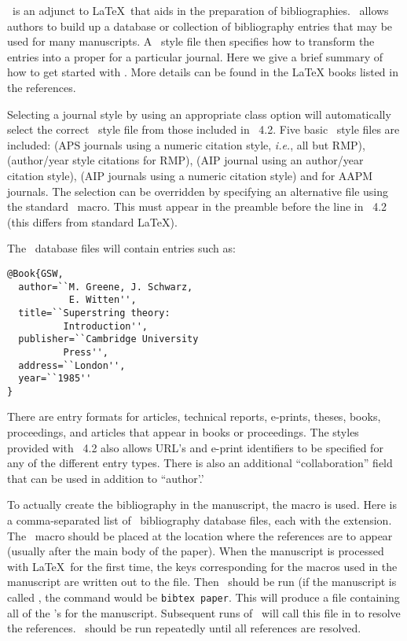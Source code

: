 \documentclass[%
,aps%
 ,twocolumn%
 ,secnumarabic%
,amssymb, amsmath,nobibnotes, aps, prl, floatfix]{revtex4-2}
\begin{document}
\BibTeX\ is an adjunct to \LaTeX\ that aids in the
preparation of  bibliographies. \BibTeX\ allows authors to build up a
database or collection of bibliography entries that may be used for many
manuscripts. A \BibTeX\ style file then specifies how to transform the
entries into a proper \cmd\bibitem{} for a particular journal. Here we
give a brief summary of how to get started with \BibTeX. More details can be
found in the LaTeX books listed in the references.

Selecting a journal style by using an appropriate class option will
automatically select the correct \BibTeX\ style file from those included in
\revtex~4.2. Five basic \BibTeX\ style files are included:  (APS journals using a numeric citation style, \textit{i.e.}, all but RMP),  (author/year style citations for RMP),
 (AIP journal using an author/year citation style),   (AIP journals using a numeric citation style) and  for AAPM journals. The selection can be overridden by specifying an
alternative  file using the standard \LaTeXe
\cmd\ macro. This must appear in the preamble
before the  line in \revtex~4.2 (this differs from
standard \LaTeX).

The \BibTeX\ database files will contain entries such as:
\begin{verbatim}
@Book{GSW,
  author=``M. Greene, J. Schwarz,
           E. Witten'',
  title=``Superstring theory:
          Introduction'',
  publisher=``Cambridge University
          Press'',
  address=``London'',
  year=``1985''
}
\end{verbatim}
There are entry formats for articles, technical reports, e-prints,
theses, books, proceedings, and articles that appear in books or
proceedings. The styles provided with
\revtex~4.2 also allows URL's and e-print identifiers to be specified
for any of the different entry types. There is also an additional
``collaboration'' field that can be used in addition to ``author'.'

To actually create the bibliography in the manuscript, the
\cmd{} macro is used. 
Here  is a comma-separated list of \BibTeX\ bibliography
database files, each with the  extension. The
\cmd\ macro should be placed at the location where the
references are to appear (usually after the main body of the
paper). When the manuscript is processed with \LaTeX\ for the first
time, the keys corresponding for the \cmd\cite{} macros used in the
manuscript are written out to the  file. Then \BibTeX\ should
be run (if the manuscript is called , the command would
be \verb+bibtex paper+. This will produce a  file containing all
of the \cmd\bibitem{}'s for the manuscript. Subsequent runs of \LaTeXe\
will call this file in to resolve the references. \LaTeXe\ should be run
repeatedly until all references are resolved.
\end{document}
